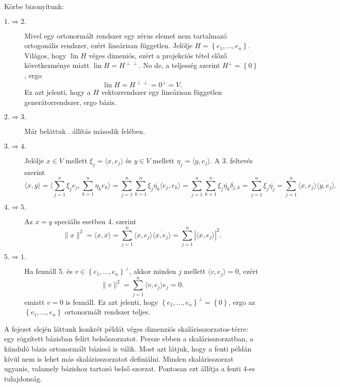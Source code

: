 \documentclass[a4paper, showtrims]{memoir}
\makeatletter
\renewenvironment{proof}[1][\proofname]
    {\par\pushQED{\qed}%
    \normalfont \topsep6\p@\@plus6\p@\relax
    \trivlist
    \item[\hskip\labelsep
        \itshape
    #1\@addpunct{:}]\ignorespaces}
    {\popQED\endtrivlist\@endpefalse}
\theoremstyle{plain}
\theoremstyle{remark}
\theoremstyle{definition}
\DeclareMathOperator{\lin}{lin}
\newcommand{\ip}[2]{\langle#1,#2\rangle}
\makeatother
\begin{document}
\begin{proof}
	Körbe bizonyítunk:
	\begin{description}
		\item[$1.\Rightarrow 2.$]
		      Mivel egy ortonormált rendszer egy zérus elemet nem tartalmazó ortogonális rendszer,
		      ezért lineárisan független.
		      Jelölje $H=\left\{ e_1,\ldots,e_n \right\}$.
		      Világos, hogy $\lin H$ véges dimeniós, ezért a projekciós tétel előző következménye miatt
		      $\lin H=H^{\perp\perp}$.
		      No de, a teljesség szerint $H^\perp=\left\{ 0 \right\}$,
		      ergo
		      \[
			      \lin H
			      =
			      H^{\perp\perp}
			      =
			      {0}^\perp
			      =
			      V.
		      \]
		      Ez azt jelenti, hogy a $H$ vektorrendszer egy lineárisan független generátorrendszer, ergo bázis.

		\item[$2.\Rightarrow 3.$]
            Már beláttuk . állítás második felében.

		\item[$3.\Rightarrow 4.$]
		      Jelölje $x\in V$ mellett $\xi_j=\ip{x}{e_j}$ és $y\in V$ mellett
		      $\eta_j=\ip{y}{e_j}$.
		      A 3. feltevés szerint
		      \[
			      \ip{x}{y}
			      =
			      \ip{\sum_{j=1}^n\xi_je_j}{\sum_{k=1}^n\eta_ke_k}
			      =
			      \sum_{j=1}^n\sum_{k=1}^n\xi_j\overline{\eta_k}\ip{e_j}{e_k}
			      =
			      \sum_{j=1}^n\sum_{k=1}^n\xi_j\overline{\eta_k}\delta_{j,k}
			      =
			      \sum_{j=1}^n\xi_j\overline{\eta_j}
			      =
			      \sum_{j=1}^n\ip{x}{e_j}\overline{\ip{y}{e_j}}.
		      \]

		\item[$4.\Rightarrow 5.$]
		      Az $x=y$ speciális esetben 4. szerint
		      \[
			      \|x\|^2
			      =
			      \ip{x}{x}
			      =
			      \sum_{j=1}^n\ip{x}{e_j}\overline{\ip{x}{e_j}}
			      =
			      \sum_{j=1}^n|\ip{x}{e_j}|^2.
		      \]

		\item[$5.\Rightarrow 1.$]
		      Ha fennáll 5. és $v\in\left\{ e_1,\ldots,e_n \right\}^\perp$,
		      akkor minden $j$ mellett $\ip{v}{e_j}=0$, ezért
		      \[
			      \|v\|^2
			      =
			      \sum_{j=1}^n\ip{v}{e_j}e_j
			      =
			      0.
		      \]
		      emiatt $v=0$ is fennáll.
		      Ez azt jelenti, hogy $\left\{ e_1,\ldots,e_n \right\}^\perp=\left\{ 0 \right\}$,
		      ergo az $\left\{ e_1,\ldots,e_n \right\}$ ortonormált rendszer teljes.\qedhere
	\end{description}
\end{proof}
A fejezet elején láttunk konkrét példát véges dimenziós skalárisszorzatos-térre:
egy rögzített bázisban felírt belsőszorzatot. Persze ebben a skalárisszorzatban,
a kiinduló bázis ortonormált bázissá is válik.
Most azt látjuk, hogy a fenti példán kívül nem is lehet más skalárisszorzatot definiálni.
Minden skalárisszorzat ugyanis, valamely bázishoz tartozó belső szorzat.
Pontosan ezt állítja a fenti 4-es tulajdonság.
\end{document}
